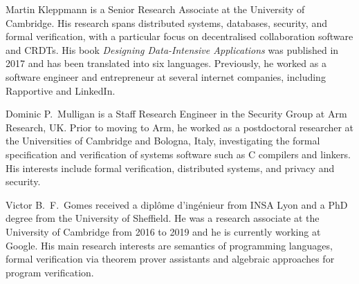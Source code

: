 \documentclass[10pt,journal,compsoc]{IEEEtran}
\begin{document}

{}
\newpage

\begin{IEEEbiography}{Martin Kleppmann}
is a Senior Research Associate at the University of Cambridge. His research spans distributed systems, databases, security, and formal verification, with a particular focus on decentralised collaboration software and CRDTs. His book \emph{Designing Data-Intensive Applications} was published in 2017 and has been translated into six languages. Previously, he worked as a software engineer and entrepreneur at several internet companies, including Rapportive and LinkedIn.
\end{IEEEbiography}
\begin{IEEEbiography}{Dominic P.\ Mulligan}
is a Staff Research Engineer in the Security Group at Arm Research, UK.  Prior to moving to Arm, he worked as a postdoctoral researcher at the Universities of Cambridge and Bologna, Italy, investigating the formal specification and verification of systems software such as C compilers and linkers.  His interests include formal verification, distributed systems, and privacy and security.
\end{IEEEbiography}
\begin{IEEEbiography}{Victor B.\ F.\ Gomes}
received a diplôme d'ingénieur from INSA Lyon and a PhD degree from the University of Sheffield. He was a research associate at the University of Cambridge from 2016 to 2019 and he is currently working at Google. His main research interests are semantics of programming languages, formal verification via theorem prover assistants and algebraic approaches for program verification.
\end{IEEEbiography}
\end{document}
